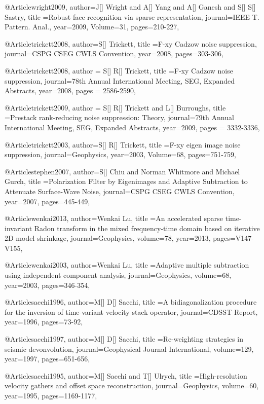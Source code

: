 @Article{wright2009,
  author={J[] Wright and A[] Yang and A[] Ganesh and S[] S[] Sastry},
  title ={Robust face recognition via sparse representation},
  journal={IEEE T. Pattern. Anal.},
  year=2009,
  Volume=31,
  pages={210-227},
}

@Article{trickett2008,
  author={S[] Trickett},
  title ={{F}-xy Cadzow noise suppression},
  journal={CSPG CSEG CWLS Convention},
  year=2008,
  pages={303-306},
}

@Article{trickett2008,
  author = {S[] R[] Trickett},
  title ={F‐xy Cadzow noise suppression},
  journal={78th Annual International Meeting, SEG, Expanded Abstracts},
  year=2008,
  pages = {2586-2590},
}

@Article{trickett2009,
  author = {S[] R[] Trickett and L[] Burroughs},
  title ={Prestack rank-reducing noise suppression: Theory},
  journal={79th Annual International Meeting, SEG, Expanded Abstracts},
  year=2009,
  pages = {3332-3336},
}

@Article{trickett2003,
  author={S[] R[] Trickett},
  title ={F-xy eigen image noise suppression},
  journal={Geophysics},
  year=2003,
  Volume=68,
  pages={751-759},
}


@Article{stephen2007,
  author={S[] Chiu and Norman Whitmore and Michael Gurch},
  title ={Polarization Filter by Eigenimages and Adaptive Subtraction to Attenuate Surface-Wave Noise},
  journal={CSPG CSEG CWLS Convention},
  year=2007,
  pages={445-449},
}

@Article{wenkai2013,
  author={Wenkai Lu},
  title ={An accelerated sparse time-invariant Radon transform in the mixed frequency-time domain based on iterative 2D model shrinkage},
  journal={Geophysics},
  volume=78,
  year=2013,
  pages={V147-V155},
}

@Article{wenkai2003,
  author={Wenkai Lu},
  title ={Adaptive multiple subtraction using independent component analysis},
  journal={Geophysics},
  volume=68,
  year=2003,
  pages={346-354},
}

@Article{sacchi1996,
  author={M[] D[] Sacchi},
  title ={A bidiagonalization procedure for the inversion of time-variant velocity stack operator},
  journal={CDSST Report},
  year=1996,
  pages={73-92},
}

@Article{sacchi1997,
  author={M[] D[] Sacchi},
  title ={Re-weighting strategies in seismic devonvolution},
  journal={Geophysical Journal International},
  volume=129,
  year=1997,
  pages={651-656},
}

@Article{sacchi1995,
  author={M[] Sacchi and T[] Ulrych},
  title ={High-resolution velocity gathers and offset space reconstruction},
  journal={Geophysics},
  volume=60,
  year=1995,
  pages={1169-1177},
}

